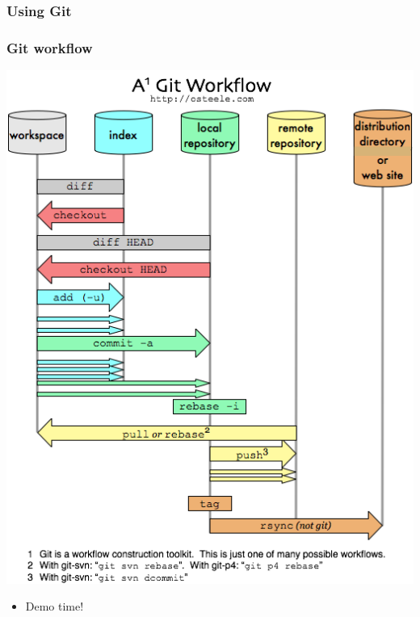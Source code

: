 \documentclass{beamer}
\begin{document}
\subsubsection{Using Git}

\begin{frame}
  \frametitle{Git workflow}
  \includegraphics[scale = 0.3]{images/git-workflow.png}
\end{frame}

\begin{frame}
  \begin{itemize}
    \item Demo time!
  \end{itemize}
\end{frame}
\end{document}
